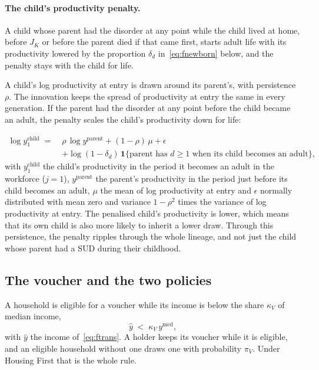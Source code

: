 \documentclass[10pt]{article}
\begin{document}
\paragraph{The child's productivity penalty.} A child whose parent had the disorder at any point while the child lived at home,
before $J_K$ or before the parent died if that came first, starts adult life with its productivity lowered
by the proportion $\delta_d$ in~\eqref{eq:fnewborn} below, and the penalty stays with the
child for life.

A child's log productivity at entry is drawn around its parent's, with persistence $\rho$. The innovation keeps the spread of productivity at entry the same in every generation. If the parent had the disorder at any point before the child became an adult, the penalty scales the child's productivity down for life:

\begin{equation}\label{eq:fnewborn}
\begin{aligned}
\log y_{1}^{\text{child}}\;=\;&\rho\,\log y^{\text{parent}}+(1-\rho)\,\mu+\epsilon\\
&+\log(1-\delta_d)\,\mathbf{1}\{\text{parent has } d\ge1 \text{ when its child becomes an adult}\},
\end{aligned}
\end{equation}
with $y_1^{\text{child}}$ the child's productivity in the period it becomes an adult in the workforce ($j=1$), $y^{\text{parent}}$ the parent's productivity in the period just before its child becomes an adult, $\mu$
the mean of log productivity at entry and $\epsilon$ normally distributed with mean zero and
variance $1-\rho^2$ times the variance of log productivity at entry.   The penalised child's productivity is lower, which means that its own child is also more likely to inherit a lower draw. Through this persistence, the penalty ripples through the whole lineage, and not just the child whose parent had a SUD during their childhood.

\subsection{The voucher and the two policies}\label{sec:fvoucher}

A household is eligible for a voucher while its income is below the share
$\kappa_V$ of median income,
\begin{equation}\label{eq:felig}
\hat y\;<\;\kappa_V\,y^{\text{med}},
\end{equation}
with $\hat y$ the income of~\eqref{eq:ftrans}. A holder keeps its voucher while it is
eligible, and an eligible household without one draws one with probability
$\pi_V$. Under Housing First that is the whole rule.
\end{document}
